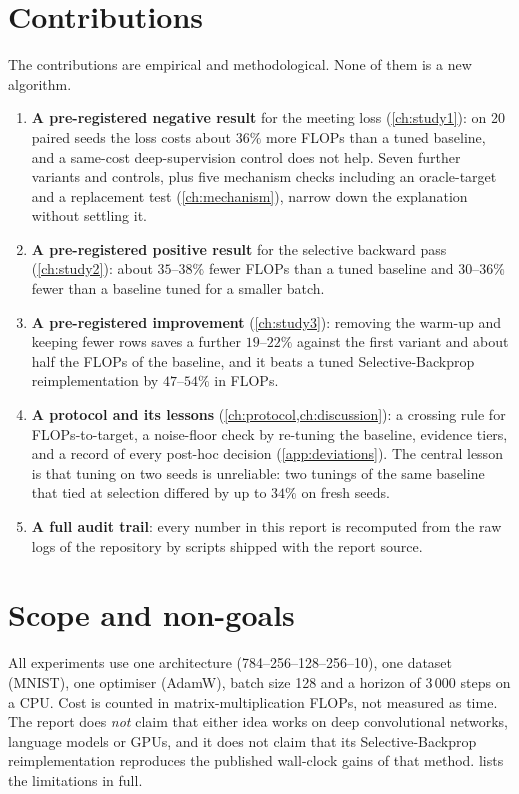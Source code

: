 \section{Contributions}
The contributions are empirical and methodological. None of them is a new algorithm.
\begin{enumerate}
\item \textbf{A pre-registered negative result} for the meeting loss (\cref{ch:study1}): on 20 paired seeds the loss costs about $36\%$ more FLOPs than a tuned baseline, and a same-cost deep-supervision control does not help. Seven further variants and controls, plus five mechanism checks including an oracle-target and a replacement test (\cref{ch:mechanism}), narrow down the explanation without settling it.
\item \textbf{A pre-registered positive result} for the selective backward pass (\cref{ch:study2}): about $35$--$38\%$ fewer FLOPs than a tuned baseline and $30$--$36\%$ fewer than a baseline tuned for a smaller batch.
\item \textbf{A pre-registered improvement} (\cref{ch:study3}): removing the warm-up and keeping fewer rows saves a further $19$--$22\%$ against the first variant and about half the FLOPs of the baseline, and it beats a tuned Selective-Backprop reimplementation by $47$--$54\%$ in FLOPs.
\item \textbf{A protocol and its lessons} (\cref{ch:protocol,ch:discussion}): a crossing rule for FLOPs-to-target, a noise-floor check by re-tuning the baseline, evidence tiers, and a record of every post-hoc decision (\cref{app:deviations}). The central lesson is that tuning on two seeds is unreliable: two tunings of the same baseline that tied at selection differed by up to $34\%$ on fresh seeds.
\item \textbf{A full audit trail}: every number in this report is recomputed from the raw logs of the repository by scripts shipped with the report source.
\end{enumerate}

\section{Scope and non-goals}
All experiments use one architecture (784--256--128--256--10), one dataset (MNIST), one optimiser (AdamW), batch size 128 and a horizon of 3\,000 steps on a CPU. Cost is counted in matrix-multiplication FLOPs, not measured as time. The report does \emph{not} claim that either idea works on deep convolutional networks, language models or GPUs, and it does not claim that its Selective-Backprop reimplementation reproduces the published wall-clock gains of that method.  lists the limitations in full.

